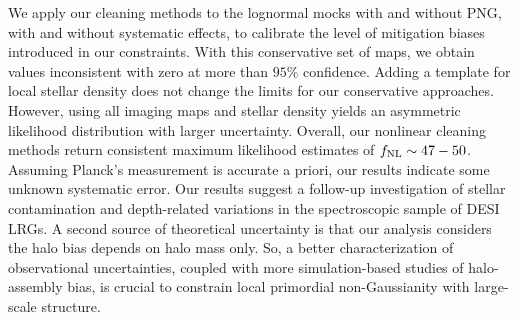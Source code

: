 We apply our cleaning methods to the lognormal mocks with and without PNG, with and without systematic effects, to calibrate the level of mitigation biases introduced in our constraints. With this conservative set of maps, we obtain values inconsistent with zero at more than $95\%$ confidence. Adding a template for local stellar density does not change the limits for our conservative approaches. However, using all imaging maps and stellar density yields an asymmetric likelihood distribution with larger uncertainty. Overall, our nonlinear cleaning methods return consistent maximum likelihood estimates of $f_{\rm NL} \sim 47-50$. Assuming Planck's measurement is accurate a priori, our results indicate some unknown systematic error. Our results suggest a follow-up investigation of stellar contamination and depth-related variations in the spectroscopic sample of DESI LRGs. A second source of theoretical uncertainty is that our analysis considers the halo bias depends on halo mass only. So, a better characterization of observational uncertainties, coupled with more simulation-based studies of halo-assembly bias, is crucial to constrain local primordial non-Gaussianity with large-scale structure.